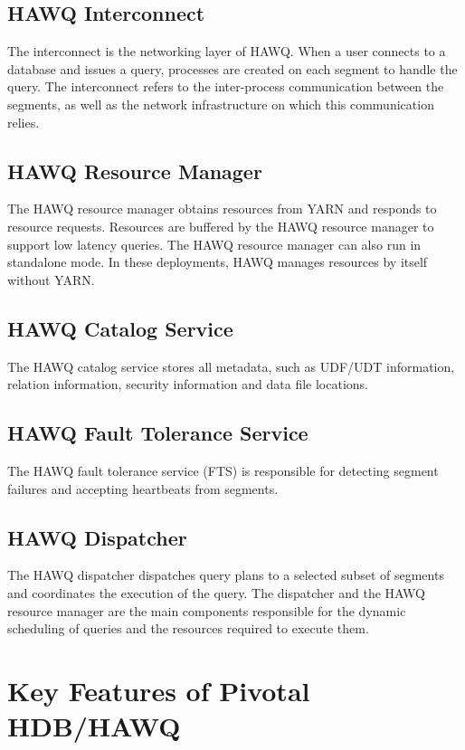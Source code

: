 \documentclass[9pt,twocolumn,twoside]{styles/osajnl}
\begin{document}
\subsection{HAWQ Interconnect}

The interconnect is the networking layer of HAWQ. When a user 
connects to a database and issues a query, processes are created on 
each segment to handle the query. The interconnect refers to the 
inter-process communication between the segments, as well as the 
network infrastructure on which this communication relies.

\subsection{HAWQ Resource Manager}

The HAWQ resource manager obtains resources from YARN and responds to 
resource requests. Resources are buffered by the HAWQ resource 
manager to support low latency queries. The HAWQ resource manager can 
also run in standalone mode. In these deployments, HAWQ manages 
resources by itself without YARN.

\subsection{HAWQ Catalog Service}

The HAWQ catalog service stores all metadata, such as 
{UDF/UDT}\cite{www-udt}
information, relation information, security information and data file 
locations.

\subsection{HAWQ Fault Tolerance Service}

The HAWQ fault tolerance service (FTS) is responsible for detecting 
segment failures and accepting heartbeats from segments.

\subsection{HAWQ Dispatcher}

The HAWQ dispatcher dispatches query plans to a selected subset of 
segments and coordinates the execution of the query. The dispatcher 
and the HAWQ resource manager are the main components responsible for 
the dynamic scheduling of queries and the resources required to 
execute them.

\section{Key Features of Pivotal HDB/HAWQ}
\end{document}
